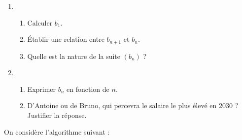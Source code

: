%
%
\begin{enumerate}
     \item %
      \begin{enumerate}[label=\alph*.]
          \item %
          Calculer $b_1$.
          \par
          \item %
          \'Etablir une relation entre $b_{n+1}$ et $b_n$.
          \par
          \item %
          Quelle est la nature de la suite $(b_n)$ ?
          \par
     \end{enumerate}
     \item %
     \begin{enumerate}[label=\alph*.]
          \item %
          Exprimer $b_n$ en fonction de $n$.
          \item %
          D'Antoine ou de Bruno, qui percevra le salaire le plus élevé en 2030 ? Justifier la réponse.
      \end{enumerate}
\end{enumerate}
%
%
\par
On considère l'algorithme suivant :
\par
